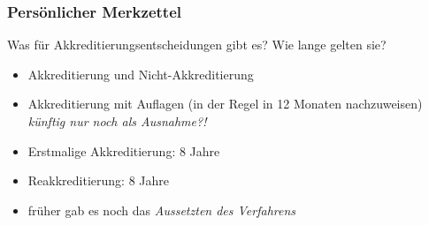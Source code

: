 \documentclass[german,10pt,xcolor=colortbl,compress]{beamer}
\begin{document}
\begin{frame}
\frametitle{Persönlicher Merkzettel}
Was für Akkreditierungsentscheidungen gibt es? Wie lange gelten sie?
\begin{itemize}
\item Akkreditierung und Nicht-Akkreditierung
\item Akkreditierung mit Auflagen (in der Regel in 12 Monaten nachzuweisen) \emph{künftig nur noch als Ausnahme?!}
\item Erstmalige Akkreditierung: 8 Jahre
\item Reakkreditierung: 8 Jahre
\item früher gab es noch das \emph{Aussetzten des Verfahrens}
\end{itemize}
\end{frame}
\end{document}
